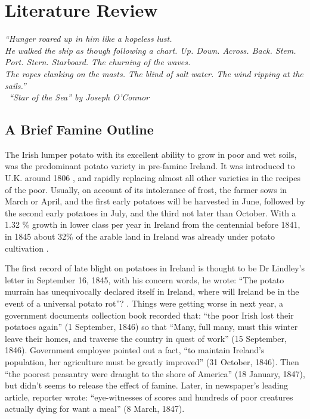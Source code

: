 \chapter{Literature Review}

\textit{``Hunger roared up in him like a hopeless lust.\\ 
He walked the ship as though following a chart. Up. Down. Across. Back. Stem. Port. Stern. Starboard. The churning of the waves. \\
The ropes clanking on the masts. The blind of salt water. The wind ripping at the sails.''\\
\textemdash\ ``Star of the Sea'' by Joseph O'Connor}
\vspace{.2cm}

\section{A Brief Famine Outline}

The Irish lumper potato with its excellent ability to grow in poor and wet soils, was the predominant potato variety in pre-famine Ireland. It was introduced to U.K. around 1806 \citep{tucker2016potato}, and rapidly replacing almost all other varieties in the recipes of the poor. Usually, on account of its intolerance of frost, the farmer sows in March or April, and the first early potatoes will be harvested in June, followed by the second early potatoes in July, and the third not later than October. With a 1.32 \% growth in lower class per year in Ireland from the centennial before 1841, in 1845 about 32\% of the arable land in Ireland was already under potato cultivation \citep{solar2015ireland}.

The first record of late blight on potatoes in Ireland is thought to be Dr Lindley's letter in September 16, 1845, with his concern words, he wrote: ``The potato murrain has unequivocally declared itself in Ireland, where will Ireland be in the event of a universal potato rot''? \citep{kelly1995great}. Things were getting worse in next year, a government documents collection book recorded that: ``the poor Irish lost their potatoes again'' (1 September, 1846) so that ``Many, full many, must this winter leave their homes, and traverse the country in quest of work'' (15 September, 1846). Government employee pointed out a fact, ``to maintain Ireland's population, her agriculture must be greatly improved'' (31 October, 1846). Then ``the poorest peasantry were draught to the shore of America'' (18 January, 1847), but didn't seems to release the effect of famine. Later, in newspaper's leading article, reporter wrote: ``eye-witnesses of scores and hundreds of poor creatures actually dying for want a meal'' (8 March, 1847). 

